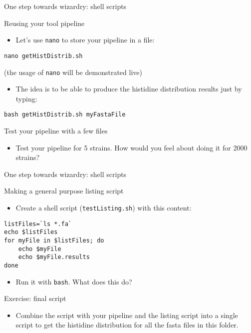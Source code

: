 \documentclass[big]{beamer}
\begin{document}
\begin{frame}[fragile,label=sec-4-1]{One step towards wizardry: shell scripts}
 \begin{block}{Reusing your tool pipeline}
\begin{itemize}
\item Let's use \texttt{nano} to store your pipeline in a file:
\end{itemize}
\begin{verbatim}
nano getHistDistrib.sh
\end{verbatim}
(the usage of \texttt{nano} will be demonstrated live) 
\begin{itemize}
\item The idea is to be able to produce the histidine distribution results just by
typing:
\end{itemize}
\begin{verbatim}
bash getHistDistrib.sh myFastaFile
\end{verbatim}
\end{block}
\begin{block}{Test your pipeline with a few files}
\begin{itemize}
\item Test your pipeline for 5 strains. How would you feel about doing it for 2000
strains?
\end{itemize}
\end{block}
\end{frame}
\begin{frame}[fragile,label=sec-4-2]{One step towards wizardry: shell scripts}
 \begin{block}{Making a general purpose listing script}
\begin{itemize}
\item Create a shell script (\texttt{testListing.sh}) with this content:
\end{itemize}
\begin{verbatim}
listFiles=`ls *.fa`
echo $listFiles
for myFile in $listFiles; do
    echo $myFile
    echo $myFile.results
done
\end{verbatim}
\begin{itemize}
\item Run it with \texttt{bash}. What does this do?
\end{itemize}
\end{block}
\begin{block}{Exercise: final script}
\begin{itemize}
\item Combine the script with your pipeline and the listing script into a single
script to get the histidine distribution for all the fasta files in this
folder.
\end{itemize}
\end{block}
\end{frame}
\end{document}
